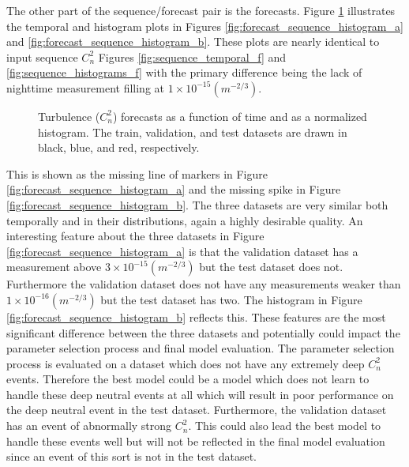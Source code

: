 The other part of the sequence/forecast pair is the forecasts. Figure \ref{fig:forecast_sequence_histogram} illustrates the temporal and histogram plots in Figures \ref{fig:forecast_sequence_histogram_a} and \ref{fig:forecast_sequence_histogram_b}. These plots are nearly identical to input sequence $C_{n}^{2}$ Figures \ref{fig:sequence_temporal_f} and \ref{fig:sequence_histograms_f} with the primary difference being the lack of nighttime measurement filling at $1 \times 10^{-15} (m^{-2/3})$.
\begin{figure}[h!]
	\centering
	\hfill
	\caption{Turbulence ($C_{n}^{2}$) forecasts as a function of time and as a normalized histogram. The train, validation, and test datasets are drawn in black, blue, and red, respectively.}
	\label{fig:forecast_sequence_histogram}
\end{figure}
This is shown as the missing line of markers in Figure \ref{fig:forecast_sequence_histogram_a} and the missing spike in Figure \ref{fig:forecast_sequence_histogram_b}. The three datasets are very similar both temporally and in their distributions, again a highly desirable quality.  An interesting feature about the three datasets in Figure \ref{fig:forecast_sequence_histogram_a} is that the validation dataset has a measurement above $3 \times 10^{-15} (m^{-2/3})$ but the test dataset does not. Furthermore the validation dataset does not have any measurements weaker than $1 \times 10^{-16} (m^{-2/3})$ but the test dataset has two. The histogram in Figure \ref{fig:forecast_sequence_histogram_b} reflects this. These features are the most significant difference between the three datasets and potentially could impact the parameter selection process and final model evaluation. The parameter selection process is evaluated on a dataset which does not have any extremely deep $C_{n}^{2}$ events. Therefore the best model could be a model which does not learn to handle these deep neutral events at all which will result in poor performance on the deep neutral event in the test dataset. Furthermore, the validation dataset has an event of abnormally strong $C_{n}^{2}$. This could also lead the best model to handle these events well but will not be reflected in the final model evaluation since an event of this sort is not in the test dataset.

